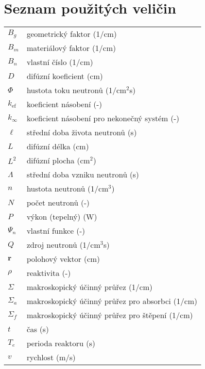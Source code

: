 \section*{Seznam použitých veličin}

\renewcommand{\arraystretch}{1.2}
\begin{table}[H]
\begin{tabular}{p{1cm}l}
  $B_g$           & geometrický faktor (1/cm) \\
  $B_m$           & materiálový faktor (1/cm) \\
  $B_n$           & vlastní číslo (1/cm) \\
  $D$             & difúzní koeficient (cm) \\
  $\Phi$          & hustota toku neutronů (1/cm$^2$s) \\
  $k_{\text{ef}}$ & koeficient násobení (-) \\
  $k_{\infty}$    & koeficient násobení pro nekonečný systém (-) \\
  $\ell$          & střední doba života neutronů (s) \\
  $L$             & difúzní délka (cm) \\
  $L^2$           & difúzní plocha (cm$^2$) \\
  $\Lambda$       & střední doba vzniku neutronů (s) \\
  $n$             & hustota neutronů (1/cm$^3$) \\
  $N$             & počet neutronů (-) \\
  $P$             & výkon (tepelný) (W) \\
  $\Psi_n$        & vlastní funkce (-) \\
  $Q$             & zdroj neutronů (1/cm$^3$s) \\
  $\textbf{r}$    & polohový vektor (cm) \\
  $\rho$          & reaktivita (-) \\
  $\Sigma$        & makroskopický účinný průřez (1/cm) \\
  $\Sigma_a$      & makroskopický účinný průřez pro absorbci (1/cm) \\
  $\Sigma_f$      & makroskopický účinný průřez pro štěpení (1/cm) \\
  $t$             & čas (s) \\
  $T_e$           & perioda reaktoru (s) \\
  $v$             & rychlost (m/s) \\

\end{tabular}
\end{table}
\renewcommand{\arraystretch}{1}
